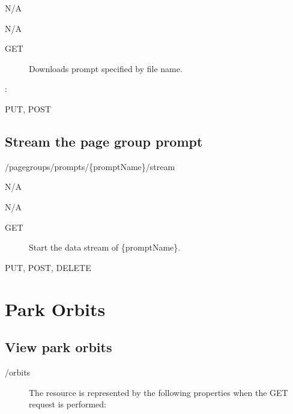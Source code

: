 \documentclass[letterpaper,10pt,english]{sphinxmanual}
\begin{document}
 N/A

 N/A
\begin{description}
\item[{ GET}] \leavevmode
Downloads prompt specified by file name.

\end{description}

:

\begin{sphinxVerbatim}[commandchars=\\\{\}]
\end{sphinxVerbatim}

 PUT, POST


\subsection{Stream the page group prompt}
\label{\detokenize{restapi:stream-the-page-group-prompt}}
 /pagegroups/prompts/\{promptName\}/stream

 N/A

 N/A
\begin{description}
\item[{ GET}] \leavevmode
Start the data stream of \{promptName\}.

\end{description}

 PUT, POST, DELETE


\section{Park Orbits}
\label{\detokenize{restapi:park-orbits}}

\subsection{View park orbits}
\label{\detokenize{restapi:view-park-orbits}}
 /orbits
\begin{description}
\item[{}] \leavevmode
The resource is represented by the following properties when the GET request is performed:

\end{description}
\end{document}
